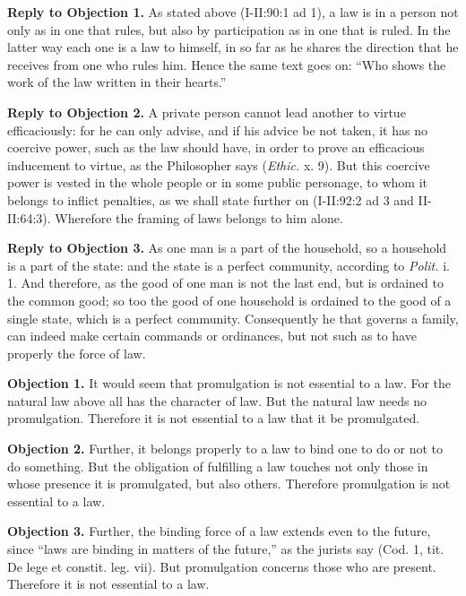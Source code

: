 \textbf{Reply to Objection 1.} As stated above (I-II:90:1 ad 1), a law is in a person not only as in one that rules, but also by participation as in one that is ruled. In the latter way each one is a law to himself, in so far as he shares the direction that he receives from one who rules him. Hence the same text goes on: ``Who shows the work of the law written in their hearts.''

\textbf{Reply to Objection 2.} A private person cannot lead another to virtue efficaciously: for he can only advise, and if his advice be not taken, it has no coercive power, such as the law should have, in order to prove an efficacious inducement to virtue, as the Philosopher says (\emph{Ethic.} x. 9). But this coercive power is vested in the whole people or in some public personage, to whom it belongs to inflict penalties, as we shall state further on (I-II:92:2 ad 3 and II-II:64:3). Wherefore the framing of laws belongs to him alone.

\textbf{Reply to Objection 3.} As one man is a part of the household, so a household is a part of the state: and the state is a perfect community, according to \emph{Polit.} i. 1. And therefore, as the good of one man is not the last end, but is ordained to the common good; so too the good of one household is ordained to the good of a single state, which is a perfect community. Consequently he that governs a family, can indeed make certain commands or ordinances, but not such as to have properly the force of law.


\textbf{Objection 1.} It would seem that promulgation is not essential to a law. For the natural law above all has the character of law. But the natural law needs no promulgation. Therefore it is not essential to a law that it be promulgated.

\textbf{Objection 2.} Further, it belongs properly to a law to bind one to do or not to do something. But the obligation of fulfilling a law touches not only those in whose presence it is promulgated, but also others. Therefore promulgation is not essential to a law.

\textbf{Objection 3.} Further, the binding force of a law extends even to the future, since ``laws are binding in matters of the future,'' as the jurists say (Cod. 1, tit. De lege et constit. leg. vii). But promulgation concerns those who are present. Therefore it is not essential to a law.

